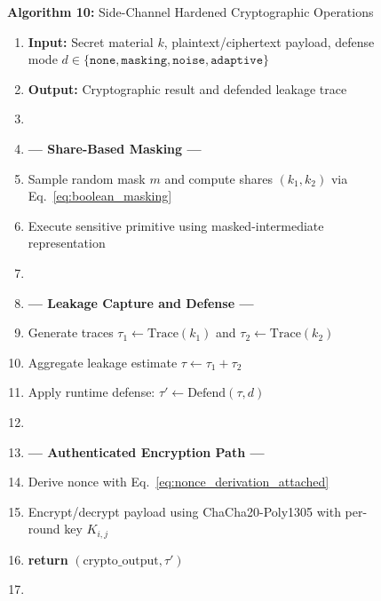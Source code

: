\documentclass[journal, 10pt, twocolumn]{IEEEtran}
\begin{document}
\begin{figure}[!t]
\hrulefill
\vspace{-0.2cm}
\begin{center}
\textbf{Algorithm 10:} Side-Channel Hardened Cryptographic Operations
\end{center}
\vspace{-0.2cm}
\hrulefill
\begin{enumerate}
    \item \textbf{Input:} Secret material $k$, plaintext/ciphertext payload, defense mode $d \in \{\texttt{none},\texttt{masking},\texttt{noise},\texttt{adaptive}\}$
    \item \textbf{Output:} Cryptographic result and defended leakage trace
    \item[]
    \item[] \textbf{--- Share-Based Masking ---}
    \item Sample random mask $m$ and compute shares $(k_1, k_2)$ via Eq.~\eqref{eq:boolean_masking}
    \item Execute sensitive primitive using masked-intermediate representation
    \item[]
    \item[] \textbf{--- Leakage Capture and Defense ---}
    \item Generate traces $\tau_1 \leftarrow \text{Trace}(k_1)$ and $\tau_2 \leftarrow \text{Trace}(k_2)$
    \item Aggregate leakage estimate $\tau \leftarrow \tau_1 + \tau_2$
    \item Apply runtime defense: $\tau' \leftarrow \text{Defend}(\tau,d)$
    \item[]
    \item[] \textbf{--- Authenticated Encryption Path ---}
    \item Derive nonce with Eq.~\eqref{eq:nonce_derivation_attached}
    \item Encrypt/decrypt payload using ChaCha20-Poly1305 with per-round key $K_{i,j}$
    \item \textbf{return} $(\text{crypto\_output}, \tau')$
    \item[]
\end{enumerate}
\hrulefill
\end{figure}
\end{document}
